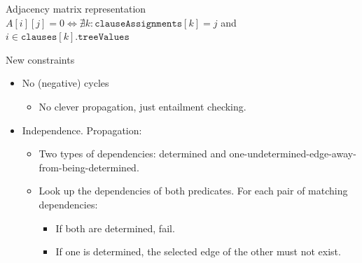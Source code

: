 \documentclass{beamer}
\begin{document}
\begin{frame}
  \begin{block}{Adjacency matrix representation}
    $A[i][j] = 0 \iff \nexists k: \texttt{clauseAssignments}[k] = j$ and $i
    \in \texttt{clauses}[k].\texttt{treeValues}$
  \end{block}
  \begin{block}{New constraints}
    \begin{itemize}
    \item No (negative) cycles
      \begin{itemize}
      \item No clever propagation, just entailment checking.
      \end{itemize}
    \item Independence. Propagation:
      \begin{itemize}
      \item Two types of dependencies: determined and
        one-undetermined-edge-away-from-being-determined.
      \item Look up the dependencies of both predicates. For each pair of
        matching dependencies:
        \begin{itemize}
        \item If both are determined, fail.
        \item If one is determined, the selected edge of the other must not
          exist.
        \end{itemize}
      \end{itemize}
    \end{itemize}
  \end{block}
\end{frame}
\end{document}
